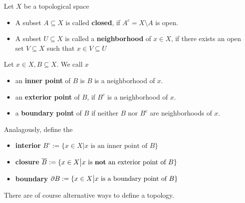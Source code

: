 \begin{dfn}[]
  Let $X$ be a topological space
  \begin{itemize}
    \item A subset $A \subseteq X$ is called \textbf{closed}, if $A^{c} = X \setminus A$ is open.
    \item A subset $U \subseteq X$ is called a \textbf{neighborhood} of $x \in X$, if there exists an open set $V \subseteq X$ such that $x \in V \subseteq U$
  \end{itemize}
  Let $x \in X, B \subseteq X$. We call $x$
  \begin{itemize}
    \item an \textbf{inner point} of $B$ is $B$ is a neighborhood of $x$.
    \item an \textbf{exterior point} of $B$, if $B^{c}$ is a neighborhood of $x$.
    \item a \textbf{boundary point} of $B$ if neither $B$ nor $B^{c}$ are neighborhoods of $x$.
  \end{itemize}
  Analagously, define the
  \begin{itemize}
    \item \textbf{interior} $B^{\circ} := \{x \in X \big\vert x \text{ is an inner point of }B\}$
    \item \textbf{closure} $\overline{B}:= \{x \in X \big\vert x \text{ is \textbf{not} an exterior point of }B\}$
    \item \textbf{boundary} $\partial B:= \{x \in X \big\vert x \text{ is a boundary point of }B\}$
  \end{itemize}
\end{dfn}
There are of course alternative ways to define a topology.
